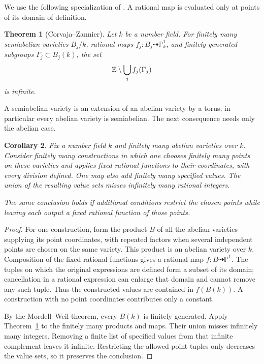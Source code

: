 \documentclass[11pt,a4paper]{article}
\newtheorem{theorem}{Theorem}[section]
\newtheorem{corollary}[theorem]{Corollary}
\theoremstyle{definition}
\begin{document}
We use the following specialization of
\cite[Theorem 1.1]{CorvajaZannier}. A rational map is evaluated only
at points of its domain of definition.

\begin{theorem}[Corvaja--Zannier]\label{thm:CZ}
Let $k$ be a number field. For finitely many semiabelian varieties
$B_j/k$, rational maps $f_j:B_j\dashrightarrow\mathbb P^1_k$,
and finitely generated subgroups $\Gamma_j\subset B_j(k)$, the set
\[
                 \mathbb Z\setminus\bigcup_j f_j(\Gamma_j)
\]
is infinite.
\end{theorem}

A semiabelian variety is an extension of an abelian variety by a
torus; in particular every abelian variety is semiabelian.
The next consequence needs only the abelian case.

\begin{corollary}\label{cor:finite-rational-combinations}
Fix a number field $k$ and finitely many abelian varieties over $k$.
Consider finitely many constructions in which one chooses finitely
many points on these varieties and applies fixed rational functions
to their coordinates, with every division defined. One may also add
finitely many specified values. The union of the resulting value
sets misses infinitely many rational integers.

The same conclusion holds if additional conditions restrict the
chosen points while leaving each output a fixed rational function
of those points.
\end{corollary}
\begin{proof}
For one construction, form the product $B$ of all the abelian
varieties supplying its point coordinates, with repeated factors
when several independent points are chosen on the same variety.
This product is an abelian variety over $k$. Composition of the
fixed rational functions gives a rational map
$f:B\dashrightarrow\mathbb P^1$. The tuples on which the original
expressions are defined form a subset of its domain; cancellation
in a rational expression can enlarge that domain and cannot remove
any such tuple. Thus the constructed values are contained in
$f(B(k))$. A construction with no point coordinates contributes
only a constant.

By the Mordell--Weil theorem, every $B(k)$ is finitely generated.
Apply Theorem~\ref{thm:CZ} to the finitely many products and maps.
Their union misses infinitely many integers. Removing a finite
list of specified values from that infinite complement leaves it
infinite. Restricting the allowed point tuples only decreases the
value sets, so it preserves the conclusion.
\end{proof}
\end{document}
